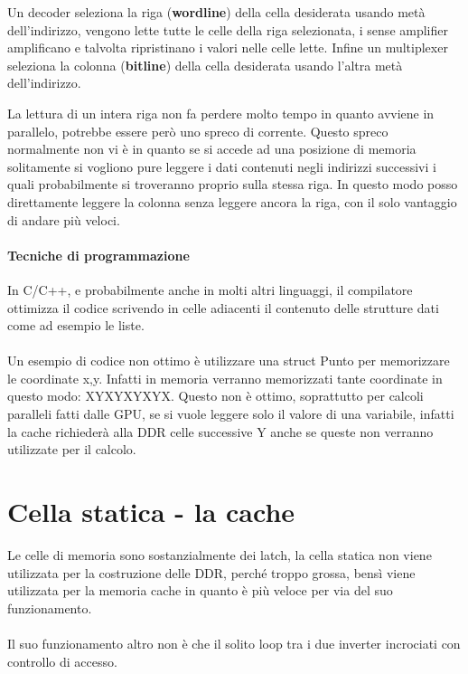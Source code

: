 Un decoder seleziona la riga
(\textbf{wordline}) della cella desiderata
usando metà dell'indirizzo, vengono lette tutte le celle della
riga selezionata, i sense amplifier amplificano e
talvolta ripristinano i valori nelle
celle lette. Infine un multiplexer seleziona la colonna
(\textbf{bitline}) della cella desiderata
usando l'altra metà dell'indirizzo.


La lettura di un intera riga non fa perdere molto tempo in quanto avviene in parallelo, potrebbe essere però uno spreco di corrente. Questo spreco normalmente non vi è in quanto se si accede ad una posizione di memoria solitamente si vogliono pure leggere i dati contenuti negli indirizzi successivi i quali probabilmente si troveranno proprio sulla stessa riga. In questo modo posso direttamente leggere la colonna senza leggere ancora la riga, con il solo vantaggio di andare più veloci.

\paragraph{Tecniche di programmazione}
In C/C++, e probabilmente anche in molti altri linguaggi, il compilatore ottimizza il codice scrivendo in celle adiacenti il contenuto delle strutture dati come ad esempio le liste.
\paragraph{}
Un esempio di codice non ottimo è utilizzare una struct Punto per memorizzare le coordinate x,y. Infatti in memoria verranno memorizzati tante coordinate in questo modo: XYXYXYXYX. Questo non è ottimo, soprattutto per calcoli paralleli fatti dalle GPU, se si vuole leggere solo il valore di una variabile, infatti la cache richiederà alla DDR celle successive Y anche se queste non verranno utilizzate per il calcolo.

\newpage
\section{Cella statica - la cache}
Le celle di memoria sono sostanzialmente dei latch, la cella statica non viene utilizzata per la costruzione delle DDR, perché troppo grossa, bensì viene utilizzata per la memoria cache in quanto è più veloce per via del suo funzionamento.
\paragraph{}
Il suo funzionamento altro non è che il solito loop tra i due inverter incrociati con controllo di accesso.


